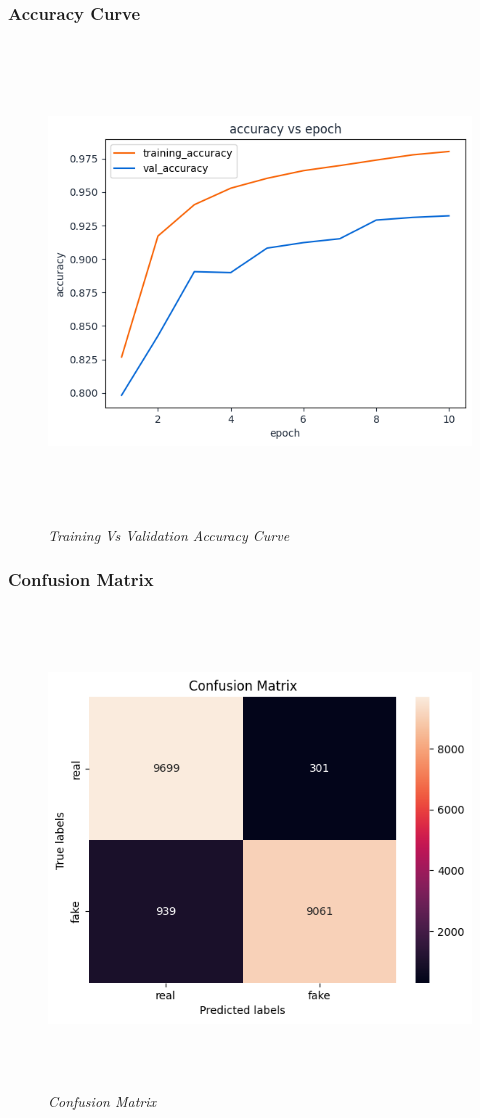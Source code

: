 \newpage
\subsubsection{Accuracy Curve}
\begin{figure}[ht]
    \centering
    \includegraphics[width=5in, height =5in ]{img/accuracyVsepoch.png}
    \caption{\textit{Training Vs Validation Accuracy Curve }}
\end{figure}
\newpage
\subsubsection{Confusion Matrix}
\begin{figure}[ht]
    \centering
    \includegraphics[width=5in, height =5in ]{img/confusionMatrixImage.png}
    \caption{\textit{Confusion Matrix }}
\end{figure}
\newpage
